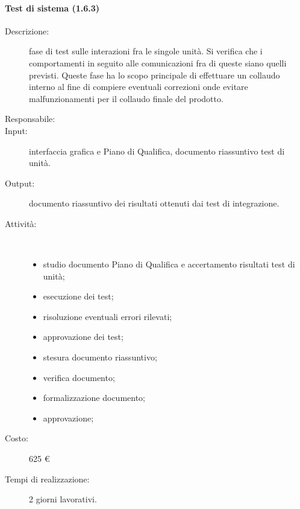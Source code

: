 \paragraph{Test di sistema (1.6.3)}  
\begin{description}
\item[Descrizione:] fase di test sulle interazioni fra le singole unità. Si verifica che i comportamenti in seguito alle comunicazioni fra di queste siano quelli previsti. Queste fase ha lo scopo principale di effettuare un collaudo interno al fine di compiere eventuali correzioni onde evitare malfunzionamenti per il collaudo finale del prodotto.
\item[Responsabile:] 
\item[Input:] interfaccia grafica e Piano di Qualifica, documento riassuntivo test di unità.
\item[Output:] documento riassuntivo dei risultati ottenuti dai test di integrazione.
\item[Attività:]\mbox{}\\[-1.5\baselineskip]
	\begin{itemize}
	\item studio documento Piano di Qualifica e accertamento risultati test di unità;
	\item esecuzione dei test;
	\item risoluzione eventuali errori rilevati;
	\item approvazione dei test;
	\item stesura documento riassuntivo;
	\item verifica documento;
	\item formalizzazione documento;
	\item approvazione;
	\end{itemize}
\item[Costo:] 625 \euro{}
\item[Tempi di realizzazione:] 2 giorni lavorativi.
\end{description}

